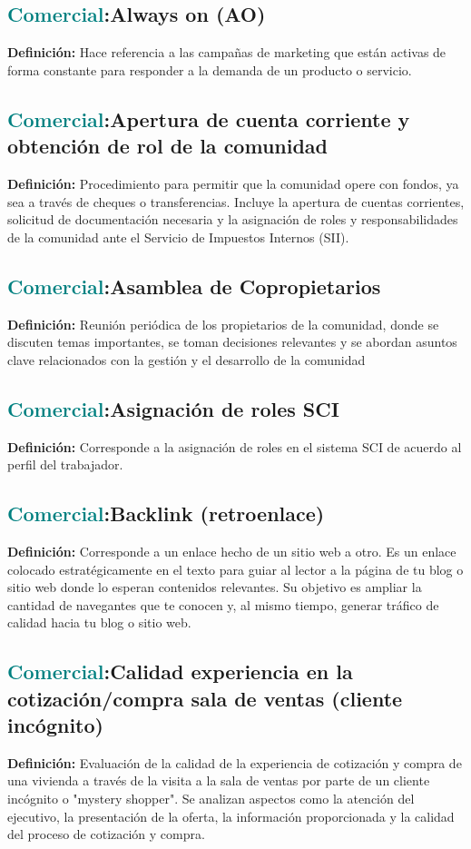 \documentclass[12pt]{article}
\begin{document}
\subsection{\textcolor{teal}{Comercial}:{Always on (AO)}}
\textbf{Definición:} Hace referencia a las campañas de marketing que están activas de forma constante para responder a la demanda de un producto o servicio.
\subsection{\textcolor{teal}{Comercial}:{Apertura de cuenta corriente y obtención de rol de la comunidad}}
\textbf{Definición:} Procedimiento para permitir que la comunidad opere con fondos, ya sea a través de cheques o transferencias. Incluye la apertura de cuentas corrientes, solicitud de documentación necesaria y la asignación de roles y responsabilidades de la comunidad ante el Servicio de Impuestos Internos (SII).
\subsection{\textcolor{teal}{Comercial}:{Asamblea de Copropietarios}}
\textbf{Definición:} Reunión periódica de los propietarios de la comunidad, donde se discuten temas importantes, se toman decisiones relevantes y se abordan asuntos clave relacionados con la gestión y el desarrollo de la comunidad
\subsection{\textcolor{teal}{Comercial}:{Asignación de roles SCI}}
\textbf{Definición:} Corresponde a la asignación de roles en el sistema SCI de acuerdo al perfil del trabajador.
\subsection{\textcolor{teal}{Comercial}:{Backlink (retroenlace)}}
\textbf{Definición:} Corresponde a un enlace hecho de un sitio web a otro. Es un enlace colocado estratégicamente en el texto para guiar al lector a la página de tu blog o sitio web donde lo esperan contenidos relevantes. Su objetivo es ampliar la cantidad de navegantes que te conocen y, al mismo tiempo, generar tráfico de calidad hacia tu blog o sitio web. 
\subsection{\textcolor{teal}{Comercial}:{Calidad experiencia en la cotización/compra sala de ventas (cliente incógnito)}}
\textbf{Definición:} Evaluación de la calidad de la experiencia de cotización y compra de una vivienda a través de la visita a la sala de ventas por parte de un cliente incógnito o "mystery shopper". Se analizan aspectos como la atención del ejecutivo, la presentación de la oferta, la información proporcionada y la calidad del proceso de cotización y compra.
\end{document}
